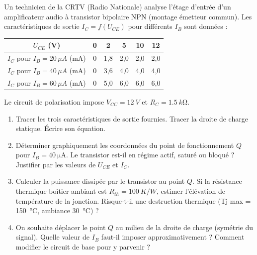 \documentclass[11pt]{article}
\begin{document}
\begin{exercice}
Un technicien de la CRTV (Radio Nationale) analyse l'étage d'entrée d'un amplificateur audio à transistor bipolaire NPN (montage émetteur commun). Les caractéristiques de sortie $I_C = f(U_{CE})$ pour différents $I_B$ sont données :
\begin{center}
\begin{tabular}{|c|c|c|c|c|c|}
\hline
$U_{CE}$ (\si{\volt}) & 0 & 2 & 5 & 10 & 12 \\
\hline $I_C$ pour $I_B = 20\,\mu A$ (mA) & 0 & 1,8 & 2,0 & 2,0 & 2,0 \\
\hline $I_C$ pour $I_B = 40\,\mu A$ (mA) & 0 & 3,6 & 4,0 & 4,0 & 4,0 \\
\hline $I_C$ pour $I_B = 60\,\mu A$ (mA) & 0 & 5,0 & 6,0 & 6,0 & 6,0 \\
\hline
\end{tabular}
\end{center}
Le circuit de polarisation impose $V_{CC} = \SI{12}{V}$ et $R_C = \SI{1,5}{k\ohm}$.
\begin{enumerate}
\item Tracer les trois caractéristiques de sortie fournies. Tracer la droite de charge statique. Écrire son équation.
\item Déterminer graphiquement les coordonnées du point de fonctionnement $Q$ pour $I_B = \SI{40}{\micro\ampere}$. Le transistor est-il en régime actif, saturé ou bloqué ? Justifier par les valeurs de $U_{CE}$ et $I_C$.
\item Calculer la puissance dissipée par le transistor au point $Q$. Si la résistance thermique boîtier-ambiant est $R_{th} = \SI{100}{K/W}$, estimer l'élévation de température de la jonction. Risque-t-il une destruction thermique (Tj max = \SI{150}{\celsius}, ambiance \SI{30}{\celsius}) ?
\item On souhaite déplacer le point $Q$ au milieu de la droite de charge (symétrie du signal). Quelle valeur de $I_B$ faut-il imposer approximativement ? Comment modifier le circuit de base pour y parvenir ?
\end{enumerate}
\end{exercice}
\end{document}
